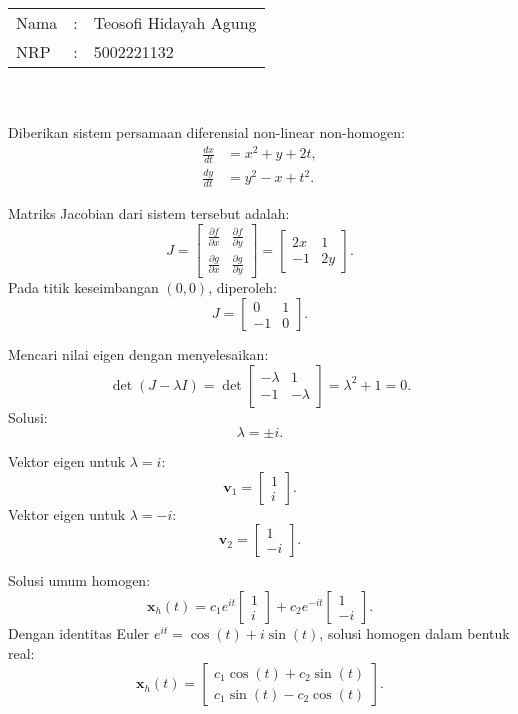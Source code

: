 \documentclass{article}
\begin{document}
\setlength{\parindent}{0pt}
    \noindent
    \begin{tabular}{|lcl|}
     \hline
     Nama&:&Teosofi Hidayah Agung\\
     NRP&:&5002221132\\
     \hline
    \end{tabular}\\~\\
    Diberikan sistem persamaan diferensial non-linear non-homogen:
    \begin{align*}
    \frac{dx}{dt} &= x^2 + y + 2t, \\
    \frac{dy}{dt} &= y^2 - x + t^2.
    \end{align*}
    
    Matriks Jacobian dari sistem tersebut adalah:
    \[
    J = \begin{bmatrix} \frac{\partial f}{\partial x} & \frac{\partial f}{\partial y} \\ \frac{\partial g}{\partial x} & \frac{\partial g}{\partial y} \end{bmatrix} = \begin{bmatrix} 2x & 1 \\ -1 & 2y \end{bmatrix}.
    \]
    Pada titik keseimbangan \((0, 0)\), diperoleh:
    \[
    J = \begin{bmatrix} 0 & 1 \\ -1 & 0 \end{bmatrix}.
    \]

    Mencari nilai eigen dengan menyelesaikan:
    \[
    \det(J - \lambda I) = \det \begin{bmatrix} -\lambda & 1 \\ -1 & -\lambda \end{bmatrix} = \lambda^2 + 1 = 0.
    \]
    Solusi:
    \[
    \lambda = \pm i.
    \]
    
    Vektor eigen untuk \(\lambda = i\):
    \[
    \mathbf{v}_1 = \begin{bmatrix} 1 \\ i \end{bmatrix}.
    \]
    Vektor eigen untuk \(\lambda = -i\):
    \[
    \mathbf{v}_2 = \begin{bmatrix} 1 \\ -i \end{bmatrix}.
    \]

    Solusi umum homogen:
    \[
    \mathbf{x}_h(t) = c_1 e^{it} \begin{bmatrix} 1 \\ i \end{bmatrix} + c_2 e^{-it} \begin{bmatrix} 1 \\ -i \end{bmatrix}.
    \]
    Dengan identitas Euler \( e^{it} = \cos(t) + i\sin(t) \), solusi homogen dalam bentuk real:
    \[
    \mathbf{x}_h(t) = \begin{bmatrix} c_1 \cos(t) + c_2 \sin(t) \\ c_1 \sin(t) - c_2 \cos(t) \end{bmatrix}.
    \]
\end{document}
